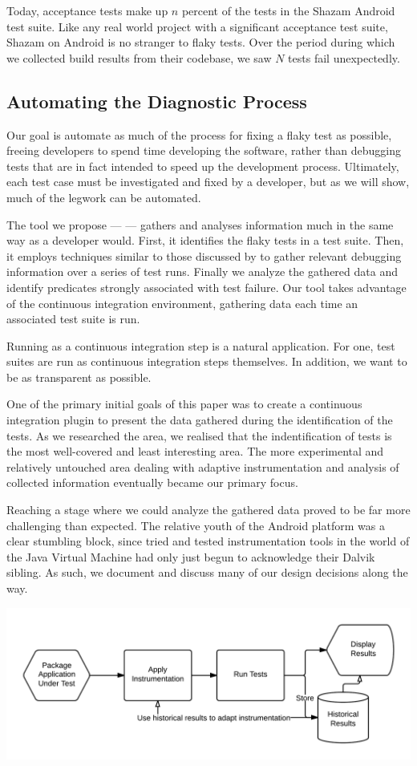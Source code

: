 Today, acceptance tests make up $n$ percent of the tests in the Shazam Android test suite. Like any real world project with a significant acceptance test suite, Shazam on Android is no stranger to flaky tests. Over the period  during which we collected build results from their codebase, we saw $N$ tests fail unexpectedly.


\subsection{Automating the Diagnostic Process}

Our goal is automate as much of the process for fixing a flaky test as possible, freeing developers to spend time developing the software, rather than debugging tests that are in fact intended to speed up the development process. Ultimately, each test case must be investigated and fixed by a developer, but as we will show, much of the legwork can be automated.

The tool we propose --- \emph{\splatter} --- gathers and analyses information much in the same way as a developer would. First, it identifies the flaky tests in a test suite. Then, it employs techniques similar to those discussed by \citet{ArumugaNainar:2010:ABI:1806799.1806839} to gather relevant debugging information over a series of test runs. Finally we analyze the gathered data and identify predicates strongly associated with test failure. Our tool takes advantage of the continuous integration environment, gathering data each time an associated test suite is run.

Running as a continuous integration step is a natural application. For one, test suites are run as continuous integration steps themselves. In addition, we want to be as transparent as possible.

One of the primary initial goals of this paper was to create a continuous integration plugin to present the data gathered during the identification of the \flaky{} tests. As we researched the area, we realised that the indentification of \flaky{} tests is the most well-covered and least interesting area. The more experimental and relatively untouched area dealing with adaptive instrumentation and analysis of collected information eventually became our primary focus.

Reaching a stage where we could analyze the gathered data proved to be far more challenging than expected. The relative youth of the Android platform was a clear stumbling block, since tried and tested instrumentation tools in the world of the Java Virtual Machine had only just begun to acknowledge their Dalvik sibling. As such, we document and discuss many of our design decisions along the way.

\includegraphics[width=\linewidth]{images/architecture_overview}

